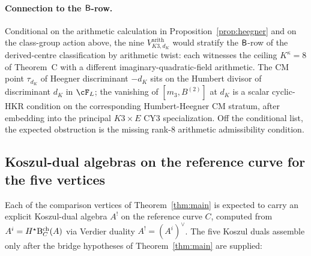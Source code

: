 \paragraph{Connection to the $\sfB$-row.}
Conditional on the arithmetic calculation in Proposition~\ref{prop:heegner} and on the class-group action above, the nine $V^{\mathrm{arith}}_{K3, d_K}$ would stratify the $\sfB$-row of the
derived-centre classification by arithmetic twist: each witnesses
the ceiling $K^\kappa = 8$ of Theorem~C with a different
imaginary-quadratic-field arithmetic. The CM point $\tau_{d_K}$ of
Heegner discriminant $-d_K$ sits on the Humbert divisor of
discriminant $d_K$ in $\cF_L$; the vanishing of
$[m_3, B^{(2)}]$ at $d_K$ is a scalar cyclic-HKR condition on the
corresponding Humbert-Heegner CM stratum, after embedding into the
principal $K3\times E$ CY3 specialization. Off the conditional list,
the expected obstruction is the missing rank-$8$ arithmetic
admissibility condition.

\subsection{Koszul-dual algebras on the reference curve for the five vertices}
\label{subsec:voa-koszul-duals}

Each of the comparison vertices of Theorem~\ref{thm:main} is expected to carry an
explicit Koszul-dual algebra $A^!$ on the reference curve $C$,
computed from $A^i = H^\star\Bar^{\mathrm{ch}}_C(A)$ via Verdier
duality $A^! = (A^i)^\vee$. The five Koszul duals assemble only after
the bridge hypotheses of Theorem~\ref{thm:main} are supplied:

